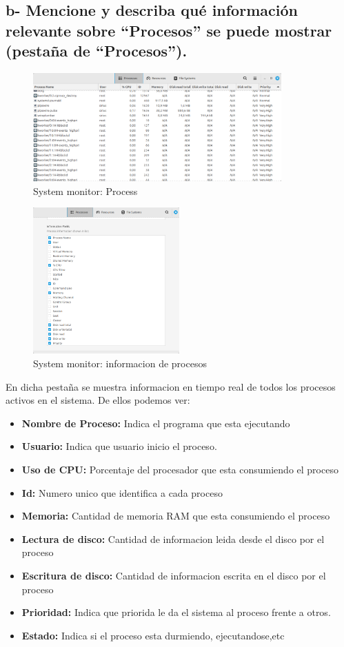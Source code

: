 \documentclass{article}
\begin{document}
\subsection*{b- Mencione y describa qué información relevante sobre “Procesos” se puede mostrar (pestaña de “Procesos”).}

\begin{figure}[h]
  \centering
  \includegraphics[width=0.85\textwidth]{resources/ej2b2.png}
  \caption{System monitor: Process}
\end{figure}

\begin{figure}[h]
  \centering
  \includegraphics[width=0.5\textwidth]{resources/ej2b.png}
  \caption{System monitor: informacion de procesos}
\end{figure}

En dicha pestaña se muestra informacion en tiempo real de todos los procesos activos en el sistema. De ellos podemos ver:
\begin{itemize}
  \item \textbf{Nombre de Proceso: }Indica el programa que esta ejecutando
  \item \textbf{Usuario:} Indica que usuario inicio el proceso.
  \item \textbf{Uso de CPU:} Porcentaje del procesador que esta consumiendo el proceso
  \item \textbf{Id:} Numero unico que identifica a cada proceso
  \item \textbf{Memoria:} Cantidad de memoria RAM que esta consumiendo el proceso
  \item \textbf{Lectura de disco:} Cantidad de informacion leida desde el disco por el proceso
  \item \textbf{Escritura de disco:} Cantidad de informacion escrita en el disco por el proceso
  \item \textbf{Prioridad:} Indica que priorida le da el sistema al proceso frente a otros.
  \item \textbf{Estado:} Indica si el proceso esta durmiendo, ejecutandose,etc
\end{itemize}
  
\end{document}
